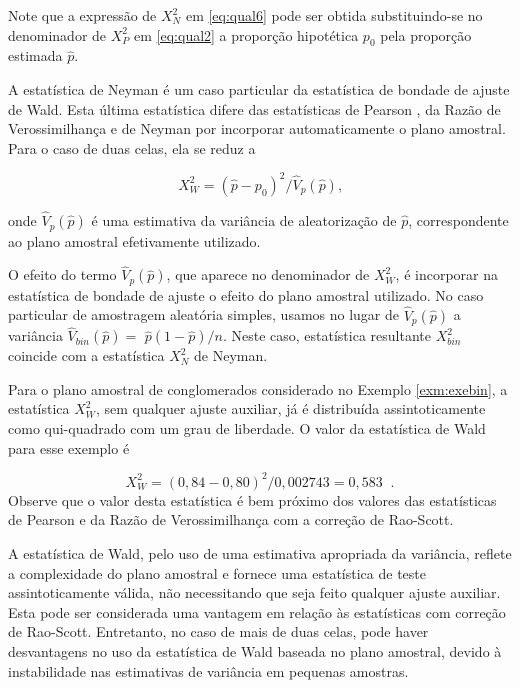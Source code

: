 \documentclass[]{book}
\theoremstyle{definition}
\theoremstyle{definition}
\theoremstyle{definition}
\theoremstyle{remark}
\begin{document}
Note que a expressão de \(X_{N}^{2}\) em \eqref{eq:qual6} pode ser obtida
substituindo-se no denominador de \(X_{P}^{2}\) em \eqref{eq:qual2} a
proporção hipotética \(p_{0}\) pela proporção estimada \(\hat{p}\).

A estatística de Neyman é um caso particular da estatística de bondade
de ajuste de Wald. Esta última estatística difere das estatísticas de
Pearson , da Razão de Verossimilhança e de Neyman por incorporar
automaticamente o plano amostral. Para o caso de duas celas, ela se
reduz a

\begin{equation}
X_{W}^{2}=\left( \widehat{p}-p_{0}\right) ^{2}/\hat{V}_{p}\left( \widehat{p}
\right) \mbox{,}  
\label{eq:qual7}
\end{equation}

onde \(\hat{V}_{p}\left( \widehat{p}\right)\) é uma estimativa da
variância de aleatorização de \(\hat{p}\), correspondente ao plano
amostral efetivamente utilizado.

O efeito do termo \(\hat{V}_{p}\left( \widehat{p}\right)\), que aparece
no denominador de \(X_{W}^{2}\), é incorporar na estatística de bondade
de ajuste o efeito do plano amostral utilizado. No caso particular de
amostragem aleatória simples, usamos no lugar de
\(\widehat{V}_{p}\left( \widehat{p}\right)\) a variância
\(\widehat{V}_{bin}\left( \widehat{p}\right) =\)
\(\widehat{p}\left( 1-\widehat{p}\right) /n\). Neste caso, estatística
resultante \(X_{bin}^{2}\) coincide com a estatística \(X_{N}^{2}\) de
Neyman.

Para o plano amostral de conglomerados considerado no Exemplo
\ref{exm:exebin}, a estatística \(X_{W}^{2}\), sem qualquer ajuste
auxiliar, já é distribuída assintoticamente como qui-quadrado com um
grau de liberdade. O valor da estatística de Wald para esse exemplo é

\[
X_{W}^{2}=\left( 0,84-0,80\right) ^{2}/0,002743=0,583\;\;\mbox{.} 
\] Observe que o valor desta estatística é bem próximo dos valores das
estatísticas de Pearson e da Razão de Verossimilhança com a correção de
Rao-Scott.

A estatística de Wald, pelo uso de uma estimativa apropriada da
variância, reflete a complexidade do plano amostral e fornece uma
estatística de teste assintoticamente válida, não necessitando que seja
feito qualquer ajuste auxiliar. Esta pode ser considerada uma vantagem
em relação às estatísticas com correção de Rao-Scott. Entretanto, no
caso de mais de duas celas, pode haver desvantagens no uso da
estatística de Wald baseada no plano amostral, devido à instabilidade
nas estimativas de variância em pequenas amostras.
\end{document}
